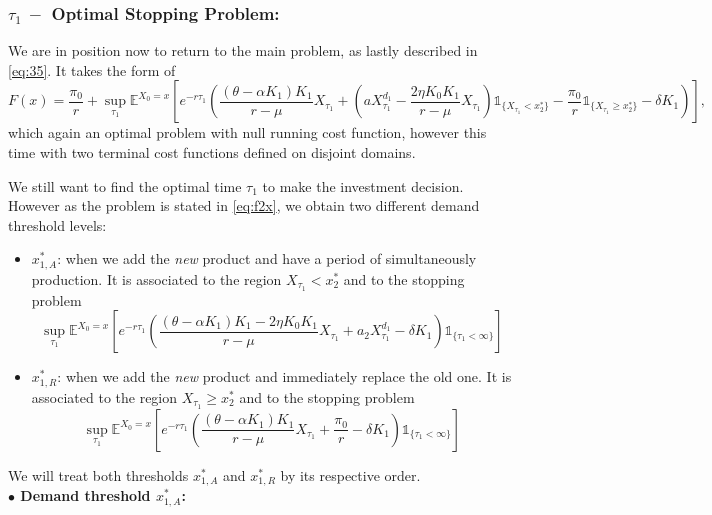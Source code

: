 \subsubsection{$\tau_1 \ - $ Optimal Stopping Problem:}

We are in position now to return to the main problem, as lastly described in \eqref{eq:35}. It takes the form of
\begin{equation}
F(x)=\frac{\pi_0}{r}+\sup _{\tau_1} \mathds{E}^{X_0=x} \left[ e^{-r \tau_1} \left( \frac{(\theta-\alpha K_1)K_1}{r-\mu} X_{\tau_1}+ 
\left( a X_{\tau_1}^{d_1} -\frac{2 \eta K_0 K_1}{r-\mu} X_{\tau_1} \right) \mathds{1}_{ \{X_{\tau_1}<x_2^* \} } -\frac{\pi_0}{r}\mathds{1}_{ \{ X_{\tau_1} \geq x_2^* \} }
-\delta K_1 \right) \right],
\label{eq:f2x}
\end{equation}
which again an optimal problem with null running cost function, however this time with two terminal cost functions defined on disjoint domains. 

We still want to find the optimal time $\tau_1$ to make the investment decision. However as the problem is stated in \eqref{eq:f2x}, we obtain two different demand threshold levels:
\begin{itemize}
	\item $x_{1,A}^*$: when we add the \textit{new} product and have a period of simultaneously production. It is associated to the region $X_{\tau_1} < x^*_2$ and to the stopping problem
	\begin{equation}
	\sup_{\tau_1} \mathds{E}^{X_0=x} \left[ e^{-r \tau_1} \left( \frac{(\theta-\alpha K_1)K_1-2 \eta K_0 K_1}{r-\mu} X_{\tau_1}+
	 a_2 X_{\tau_1}^{d_1} - \delta K_1 \right) \mathds{1}_{ \{ \tau_1 < \infty \} } \right]
	 \label{3:add}
	 \end{equation}
	\item $x_{1,R}^*$: when we add the \textit{new} product and immediately replace the old one. It is associated to the region $X_{\tau_1} \geq x^*_2$ and to the stopping problem
	\begin{equation}
	\sup_{\tau_1} \mathds{E}^{X_0=x} \left[ e^{-r \tau_1} \left( \frac{(\theta-\alpha K_1)K_1}{r-\mu} X_{\tau_1}+
	\frac{\pi_0}{r} - \delta K_1 \right) \mathds{1}_{ \{ \tau_1 < \infty \} } \right]
	\label{3:r}
	\end{equation}
\end{itemize}

We will treat both thresholds $x_{1,A}^*$ and $x_{1,R}^*$ by its respective order.
\\
\textbf{$\bullet$ Demand threshold $x^*_{1,A}$:}

